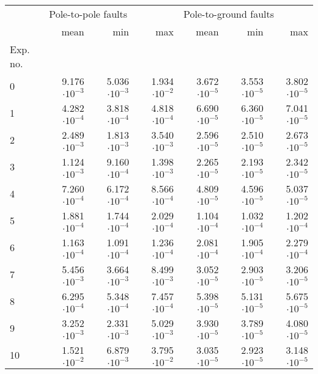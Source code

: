 \begin{tabular}{lrrrrrr}
\toprule
{} & \multicolumn{3}{l}{Pole-to-pole faults} & \multicolumn{3}{l}{Pole-to-ground faults} \\
{} &                mean &       min &       max &                  mean &       min &       max \\
Exp. no. &                     &           &           &                       &           &           \\
\midrule
0        &           9.176$\cdot10^{-3}$ & 5.036$\cdot10^{-3}$ & 1.934$\cdot10^{-2}$ &             3.672$\cdot10^{-5}$ & 3.553$\cdot10^{-5}$ & 3.802$\cdot10^{-5}$ \\
1        &           4.282$\cdot10^{-4}$ & 3.818$\cdot10^{-4}$ & 4.818$\cdot10^{-4}$ &             6.690$\cdot10^{-5}$ & 6.360$\cdot10^{-5}$ & 7.041$\cdot10^{-5}$ \\
2        &           2.489$\cdot10^{-3}$ & 1.813$\cdot10^{-3}$ & 3.540$\cdot10^{-3}$ &             2.596$\cdot10^{-5}$ & 2.510$\cdot10^{-5}$ & 2.673$\cdot10^{-5}$ \\
3        &           1.124$\cdot10^{-3}$ & 9.160$\cdot10^{-4}$ & 1.398$\cdot10^{-3}$ &             2.265$\cdot10^{-5}$ & 2.193$\cdot10^{-5}$ & 2.342$\cdot10^{-5}$ \\
4        &           7.260$\cdot10^{-4}$ & 6.172$\cdot10^{-4}$ & 8.566$\cdot10^{-4}$ &             4.809$\cdot10^{-5}$ & 4.596$\cdot10^{-5}$ & 5.037$\cdot10^{-5}$ \\
5        &           1.881$\cdot10^{-4}$ & 1.744$\cdot10^{-4}$ & 2.029$\cdot10^{-4}$ &             1.104$\cdot10^{-4}$ & 1.032$\cdot10^{-4}$ & 1.202$\cdot10^{-4}$ \\
6        &           1.163$\cdot10^{-4}$ & 1.091$\cdot10^{-4}$ & 1.236$\cdot10^{-4}$ &             2.081$\cdot10^{-4}$ & 1.905$\cdot10^{-4}$ & 2.279$\cdot10^{-4}$ \\
7        &           5.456$\cdot10^{-3}$ & 3.664$\cdot10^{-3}$ & 8.499$\cdot10^{-3}$ &             3.052$\cdot10^{-5}$ & 2.903$\cdot10^{-5}$ & 3.206$\cdot10^{-5}$ \\
8        &           6.295$\cdot10^{-4}$ & 5.348$\cdot10^{-4}$ & 7.457$\cdot10^{-4}$ &             5.398$\cdot10^{-5}$ & 5.131$\cdot10^{-5}$ & 5.675$\cdot10^{-5}$ \\
9        &           3.252$\cdot10^{-3}$ & 2.331$\cdot10^{-3}$ & 5.029$\cdot10^{-3}$ &             3.930$\cdot10^{-5}$ & 3.789$\cdot10^{-5}$ & 4.080$\cdot10^{-5}$ \\
10       &           1.521$\cdot10^{-2}$ & 6.879$\cdot10^{-3}$ & 3.795$\cdot10^{-2}$ &             3.035$\cdot10^{-5}$ & 2.923$\cdot10^{-5}$ & 3.148$\cdot10^{-5}$ \\
\bottomrule
\end{tabular}
